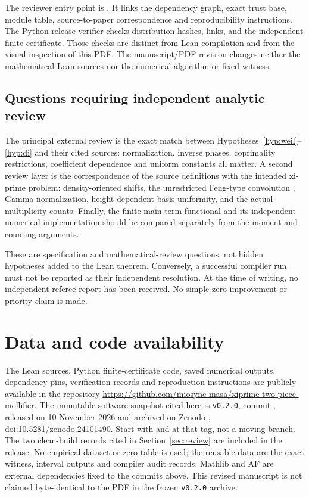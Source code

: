 \documentclass[11pt]{article}
\theoremstyle{definition}
\begin{document}
The reviewer entry point is .
It links the dependency graph, exact trust base, module table,
source-to-paper correspondence and reproducibility instructions.
The Python release verifier checks distribution hashes, links,
and the independent finite certificate. Those checks are distinct
from Lean compilation and from the visual inspection of this PDF.
The manuscript/PDF revision changes neither the mathematical Lean
sources nor the numerical algorithm or fixed witness.

\subsection{Questions requiring independent analytic review}

The principal external review is the exact match between
Hypotheses~\ref{hyp:weil}--\ref{hyp:di} and their cited sources:
normalization, inverse phases, coprimality restrictions, coefficient
dependence and uniform constants all matter. A second review layer is
the correspondence of the source definitions with the intended
xi-prime problem: density-oriented shifts, the unrestricted Feng-type
convolution \cite{Feng}, Gamma normalization, height-dependent basis uniformity,
and the actual multiplicity counts. Finally, the finite main-term
functional and its independent numerical implementation should be
compared separately from the moment and counting arguments.

These are specification and mathematical-review questions, not hidden
hypotheses added to the Lean theorem. Conversely, a successful
compiler run must not be reported as their independent resolution.
At the time of writing, no independent referee report has been received.
No simple-zero improvement or priority claim is made.

\clearpage
\section*{Data and code availability}

The Lean sources, Python finite-certificate code, saved numerical outputs,
dependency pins, verification records and reproduction instructions are
publicly available in the repository
\url{https://github.com/miosync-masa/xiprime-two-piece-mollifier}.
The immutable software snapshot cited here is \texttt{v0.2.0},
commit ,
released on 10 November 2026 and archived on Zenodo
\cite{Repo}, \href{https://doi.org/10.5281/zenodo.24101490}{doi:10.5281/zenodo.24101490}.
Start with  and
 at that tag, not a moving branch.
The two clean-build records cited in Section~\ref{sec:review} are included
in the release. No empirical dataset or zero table is used; the reusable
data are the exact witness, interval outputs and compiler audit records.
Mathlib and AF are external dependencies fixed to the commits above.
This revised manuscript is not claimed byte-identical to the PDF in
the frozen \texttt{v0.2.0} archive.
\end{document}
